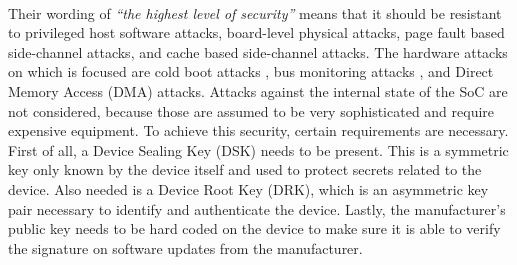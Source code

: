 \paragraph*{}
Their wording of \textit{\enquote{the highest level of security}} means that it should be resistant to privileged host software attacks, board-level physical attacks, page fault based side-channel attacks, and cache based side-channel attacks. The hardware attacks on which is focused are cold boot attacks \cite{HuberManuel2016Afff}, bus monitoring attacks \cite{TPMGenie}, and Direct Memory Access (DMA) attacks. Attacks against the internal state of the SoC are not considered, because those are assumed to be very sophisticated and require expensive equipment. To achieve this security, certain requirements are necessary. First of all, a Device Sealing Key (DSK) needs to be present. This is a symmetric key only known by the device itself and used to protect secrets related to the device. Also needed is a Device Root Key (DRK), which is an asymmetric key pair necessary to identify and authenticate the device. Lastly, the manufacturer's public key needs to be hard coded on the device to make sure it is able to verify the signature on software updates from the manufacturer. 

